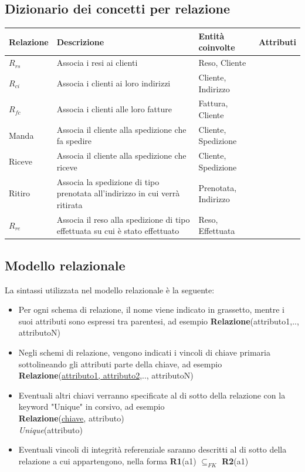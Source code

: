 \documentclass[a4paper,12pt]{article}
\begin{document}
\subsection{Dizionario dei concetti per relazione}
\begin{table}[H]
	\centering
	\begin{tabularx}{\dimexpr{}\arrayrulewidth}{|*{4}{Y|}} %
		\hline
		\textbf{Relazione} & \textbf{Descrizione} & \textbf{Entità coinvolte} & \textbf{Attributi} \\ \hline
		$R_{rs}$ & Associa i resi ai clienti & Reso, Cliente & \\ 
		\hline
		$R_{ci}$ & Associa i clienti ai loro indirizzi & Cliente, Indirizzo & \\ 
    \hline
    $R_{fc}$ & Associa i clienti alle loro fatture & Fattura, Cliente & \\
    \hline
    Manda & Associa il cliente alla spedizione che fa spedire & Cliente, Spedizione & \\
    \hline 
    Riceve & Associa il cliente alla spedizione che riceve & Cliente, Spedizione & \\
    \hline
    Ritiro & Associa la spedizione di tipo prenotata all'indirizzo in cui verrà ritirata & Prenotata, Indirizzo & \\
    \hline 
    $R_{re}$ & Associa il reso alla spedizione di tipo effettuata su cui è stato effettuato & Reso, Effettuata & \\ \hline 
	\end{tabularx}
\end{table}

\subsection{Modello relazionale}
La sintassi utilizzata nel modello relazionale è la seguente:
\begin{itemize}
  \item Per ogni schema di relazione, il nome viene indicato in grassetto, mentre i suoi attributi sono espressi tra parentesi, ad esempio \textbf{Relazione}(attributo1,.., attributoN)
  \item Negli schemi di relazione, vengono indicati i vincoli di chiave primaria sottolineando gli attributi parte della chiave, ad esempio \textbf{Relazione}(\underline{attributo1, attributo2},.., attributoN)
  \item Eventuali altri chiavi verranno specificate al di sotto della relazione con la keyword "Unique" in corsivo, ad esempio \\ \textbf{Relazione}(\underline{chiave}, attributo)\\ \textit{Unique}(attributo)
  \item Eventuali vincoli di integrità referenziale saranno descritti al di sotto della relazione a cui appartengono, nella forma \textbf{R1}(a1) $\subseteq _{FK}$ \textbf{R2}(a1)
\end{itemize}
\end{document}
